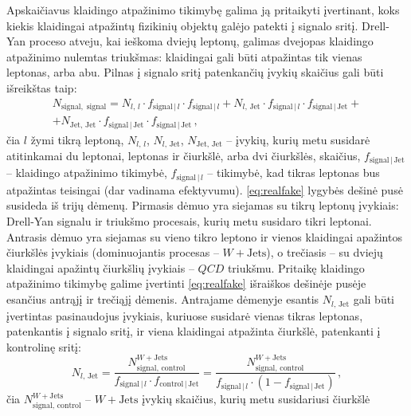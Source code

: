 \documentclass[a4paper, 12pt, oneside]{article}
\newcommand{\WJets}{W\! +\!\mathrm{Jets}}
\newcommand{\QCD}{QC\! D}
\newlength\q
\begin{document}
Apskaičiavus klaidingo atpažinimo tikimybę galima ją pritaikyti įvertinant, koks kiekis klaidingai atpažintų fizikinių objektų
galėjo patekti į signalo sritį.
Drell-Yan proceso atveju, kai ieškoma dviejų leptonų, galimas dvejopas klaidingo atpažinimo nulemtas triukšmas: klaidingai gali būti
atpažintas tik vienas leptonas, arba abu.
Pilnas į signalo sritį patenkančių įvykių skaičius gali būti išreikštas taip:
\begin{multline}
	\label{eq:realfake}
	N_{\mathrm{signal, \; signal}} = N_{l, \, l} \cdot f_{\mathrm{signal} \,| \,l} \cdot f_{\mathrm{signal} \,| \, l} +
	N_{l, \, \mathrm{Jet}} \cdot f_{\mathrm{signal} \,| \, l} \cdot f_{\mathrm{signal} \,| \,\mathrm{Jet}} + \\[5pt] +
	N_{\mathrm{Jet, \, Jet}} \cdot f_{\mathrm{signal} \,| \,\mathrm{Jet}} \cdot f_{\mathrm{signal} \,| \,\mathrm{Jet}} \, ,
\end{multline}
čia $l$ žymi tikrą leptoną, $N_{l, \, l}$, $N_{l, \, \mathrm{Jet}}$, $N_{\mathrm{Jet, \, Jet}}$ -- įvykių,
kurių metu susidarė atitinkamai du leptonai, leptonas ir čiurkšlė, arba dvi čiurkšlės, skaičius,
$f_{\mathrm{signal} \,| \,\mathrm{Jet}}$ -- klaidingo atpažinimo tikimybė, $f_{\mathrm{signal} \,| \,l}$ -- tikimybė,
kad tikras leptonas bus atpažintas teisingai (dar vadinama efektyvumu).
\eqref{eq:realfake} lygybės dešinė pusė susideda iš trijų dėmenų.
Pirmasis dėmuo yra siejamas su tikrų leptonų įvykiais: Drell-Yan signalu ir triukšmo procesais, kurių metu susidaro tikri leptonai.
Antrasis dėmuo yra siejamas su vieno tikro leptono ir vienos klaidingai apažintos čiurkšlės įvykiais
(dominuojantis procesas -- $\WJets$), o trečiasis -- su dviejų klaidingai apažintų čiurkšlių įvykiais -- $\QCD$ triukšmu.
Pritaikę klaidingo atpažinimo tikimybę galime įvertinti \eqref{eq:realfake} išraiškos dešinėje pusėje esančius antrąjį ir trečiąjį dėmenis.
Antrajame dėmenyje esantis $N_{l, \, \mathrm{Jet}}$ gali būti įvertintas pasinaudojus įvykiais, kuriuose susidarė vienas tikras
leptonas, patenkantis į signalo sritį, ir viena klaidingai atpažinta čiurkšlė, patenkanti į kontrolinę sritį:
\begin{equation}
	\label{eq:FRWjets}
	N_{l, \, \mathrm{Jet}} = \frac{N^{\WJets}_{\mathrm{signal, \, control}}}
	{f_{\mathrm{signal} \,| \, l}\cdot f_{\mathrm{control} \,| \, \mathrm{Jet}}} =
	\frac{N^{\WJets}_{\mathrm{signal, \, control}}}
	{f_{\mathrm{signal} \,| \, l}\cdot \left( 1 - f_{\mathrm{signal} \,| \, \mathrm{Jet}} \right)}	\, ,
\end{equation}
čia $N^{\WJets}_{\mathrm{signal, \, control}}$ -- $\WJets$ įvykių skaičius, kurių metu susidariusi čiurkšlė
\end{document}
